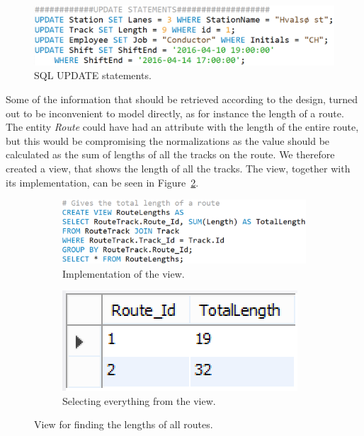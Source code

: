 \begin{figure}[h]
    \centering
    \includegraphics[scale=.5]{img/UPDATE_Statements}
    \caption{SQL UPDATE statements.}
    \label{fig:update}
\end{figure}

Some of the information that should be retrieved according to the design, 
turned out to be inconvenient to model directly, as for instance the length 
of a route. The entity \emph{Route} could have had an attribute with the length 
of the entire route, but this would be compromising the normalizations as the 
value should be calculated as the sum of lengths of all the tracks on the 
route. We therefore created a view, that shows the length of all the 
tracks. The view, together with its implementation, can be seen in 
Figure~\ref{fig:length}.

\begin{figure}[h]
    \centering
    \begin{subfigure}[b]{0.45 \textwidth}
        \centering
        \includegraphics[width=\textwidth]{img/RouteLengths}
        \caption{Implementation of the view.}
    \end{subfigure}
    \begin{subfigure}[b]{0.45 \textwidth}
        \centering
        \includegraphics{img/RouteLengthsView}
        \caption{Selecting everything from the view.}
    \end{subfigure}
    \caption{View for finding the lengths of all routes.}
    \label{fig:length}
\end{figure}

